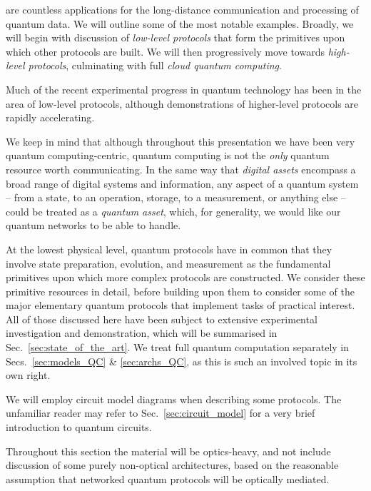%
%

 are countless applications for the long-distance communication and processing of quantum data. We will outline some of the most notable examples. Broadly, we will begin with discussion of \textit{low-level protocols} that form the primitives upon which other protocols are built. We will then progressively move towards \textit{high-level protocols}, culminating with full \textit{cloud quantum computing}.

Much of the recent experimental progress in quantum technology has been in the area of low-level protocols, although demonstrations of higher-level protocols are rapidly accelerating.

We keep in mind that although throughout this presentation we have been very quantum computing-centric, quantum computing is not the \textit{only} quantum resource worth communicating. In the same way that \textit{digital assets} encompass a broad range of digital systems and information, any aspect of a quantum system -- from a state, to an operation, storage, to a measurement, or anything else -- could be treated as a \textit{quantum asset}, which, for generality, we would like our quantum networks to be able to handle.

At the lowest physical level, quantum protocols have in common that they involve state preparation, evolution, and measurement as the fundamental primitives upon which more complex protocols are constructed. We consider these primitive resources in detail, before building upon them to consider some of the major elementary quantum protocols that implement tasks of practical interest. All of those discussed here have been subject to extensive experimental investigation and demonstration, which will be summarised in Sec.~\ref{sec:state_of_the_art}. We treat full quantum computation separately in Secs.~\ref{sec:models_QC} \& \ref{sec:archs_QC}, as this is such an involved topic in its own right.

We will employ circuit model diagrams when describing some protocols. The unfamiliar reader may refer to Sec.~\ref{sec:circuit_model} for a very brief introduction to quantum circuits.

Throughout this section the material will be optics-heavy, and not include discussion of some purely non-optical architectures, based on the reasonable assumption that networked quantum protocols will be optically mediated.

%
%

